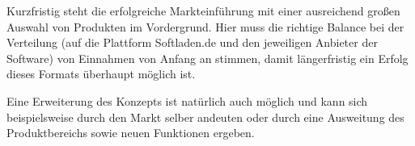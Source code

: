 Kurzfristig steht die erfolgreiche Markteinführung mit einer ausreichend großen Auswahl von Produkten im Vordergrund. Hier muss die richtige Balance bei der Verteilung (auf die Plattform Softladen.de und den jeweiligen Anbieter der Software) von Einnahmen von Anfang an stimmen, damit längerfristig ein Erfolg dieses Formats überhaupt möglich ist. 

Eine Erweiterung des Konzepts ist natürlich auch möglich und kann sich beispielsweise durch den Markt selber andeuten oder durch eine Ausweitung des Produktbereichs sowie neuen Funktionen ergeben.
